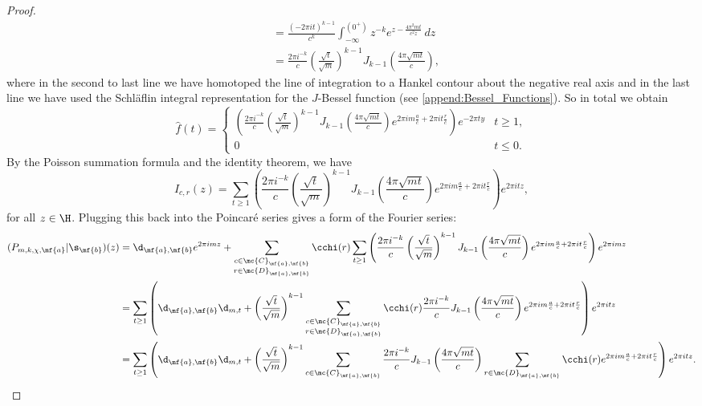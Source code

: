 \begin{proof}
\begin{align*}
        &= \frac{(-2\pi it)^{k-1}}{c^{k}}\int_{-\infty}^{(0^{+})}z^{-k}e^{z-\frac{4\pi^{2}mt}{c^{2}z}}\,dz \\
        &= \frac{2\pi i^{-k}}{c}\left(\frac{\sqrt{t}}{\sqrt{m}}\right)^{k-1}J_{k-1}\left(\frac{4\pi\sqrt{mt}}{c}\right),
      \end{align*}
      where in the second to last line we have homotoped the line of integration to a Hankel contour about the negative real axis and in the last line we have used the Schl\"aflin integral representation for the $J$-Bessel function (see \cref{append:Bessel_Functions}). So in total we obtain
      \[
        \hat{f}(t) = \begin{cases} \left(\frac{2\pi i^{-k}}{c}\left(\frac{\sqrt{t}}{\sqrt{m}}\right)^{k-1}J_{k-1}\left(\frac{4\pi\sqrt{mt}}{c}\right)e^{2\pi im\frac{a}{c}+2\pi it\frac{r}{c}}\right)e^{-2\pi ty} & t \ge 1, \\ 0 & t \le 0. \end{cases}
      \]
      By the Poisson summation formula and the identity theorem, we have
      \[
        I_{c,r}(z) = \sum_{t \ge 1}\left(\frac{2\pi i^{-k}}{c}\left(\frac{\sqrt{t}}{\sqrt{m}}\right)^{k-1}J_{k-1}\left(\frac{4\pi\sqrt{mt}}{c}\right)e^{2\pi im\frac{a}{c}+2\pi it\frac{r}{c}}\right)e^{2\pi itz},
      \]
      for all $z \in \H$. Plugging this back into the Poincar\'e series gives a form of the Fourier series:
      \begin{align*}
        (P_{m,k,\chi,\mf{a}}|\s_{\mf{b}})(z) &= \d_{\mf{a},\mf{b}}e^{2\pi imz}+\sum_{\substack{c \in \mc{C}_{\mf{a},\mf{b}} \\ r \in \mc{D}_{\mf{a},\mf{b}}}}\cchi(r)\sum_{t \ge 1}\left(\frac{2\pi i^{-k}}{c}\left(\frac{\sqrt{t}}{\sqrt{m}}\right)^{k-1}J_{k-1}\left(\frac{4\pi\sqrt{mt}}{c}\right)e^{2\pi im\frac{a}{c}+2\pi it\frac{r}{c}}\right)e^{2\pi imz} \\
        &= \sum_{t \ge 1}\left(\d_{\mf{a},\mf{b}}\d_{m,t}+\left(\frac{\sqrt{t}}{\sqrt{m}}\right)^{k-1}\sum_{\substack{c \in \mc{C}_{\mf{a},\mf{b}} \\ r \in \mc{D}_{\mf{a},\mf{b}}}}\cchi(r)\frac{2\pi i^{-k}}{c}J_{k-1}\left(\frac{4\pi\sqrt{mt}}{c}\right)e^{2\pi im\frac{a}{c}+2\pi it\frac{r}{c}}\right)e^{2\pi itz} \\
        &= \sum_{t \ge 1}\left(\d_{\mf{a},\mf{b}}\d_{m,t}+\left(\frac{\sqrt{t}}{\sqrt{m}}\right)^{k-1}\sum_{\substack{c \in \mc{C}_{\mf{a},\mf{b}}}}\frac{2\pi i^{-k}}{c}J_{k-1}\left(\frac{4\pi\sqrt{mt}}{c}\right)\sum_{r \in \mc{D}_{\mf{a},\mf{b}}}\cchi(r)e^{2\pi im\frac{a}{c}+2\pi it\frac{r}{c}}\right)e^{2\pi itz}.

\end{align*}
\end{proof}
